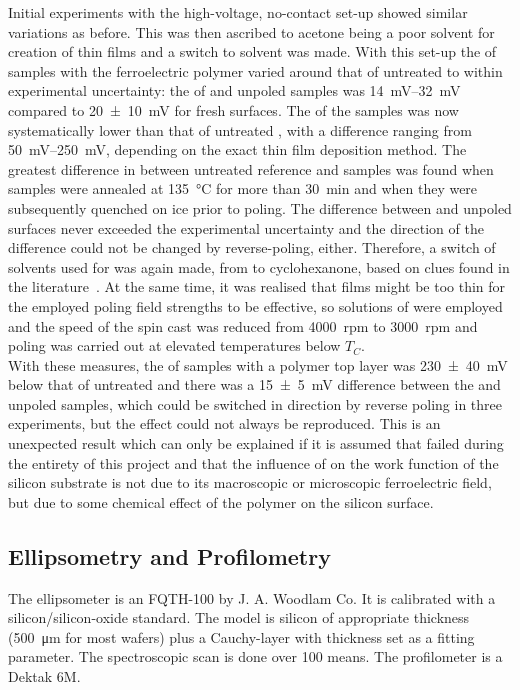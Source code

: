 Initial experiments with the high-voltage, no-contact set-up showed similar variations as before. This was then ascribed to acetone being a poor solvent for creation of \pvdf{} thin films and a switch to \dmf{} solvent was made. With this set-up the \spv{} of samples with the ferroelectric polymer varied around that of untreated \sih{} to within experimental uncertainty: the \spv{} of  and unpoled \pvdf{} samples was \SIrange{14}{32}{\milli\volt} compared to \SI{20+-10}{\milli\volt} for fresh \sih{} surfaces. The \cpd{} of the \pvdf{} samples was now systematically lower than that of untreated \sih{}, with a difference ranging from \SIrange{50}{250}{\milli\volt}, depending on the exact thin film deposition method. The greatest difference in \cpd{} between untreated reference and \pvdf{} samples was found when samples were annealed at \SI{135}{\degreeCelsius} for more than \SI{30}{\minute} and when they were subsequently quenched on ice prior to poling. The difference between  and unpoled \pvdf{} surfaces never exceeded the experimental uncertainty and the direction of the difference could not be changed by reverse-poling, either. Therefore, a switch of solvents used for \pvdf{} was again made, from \dmf{} to cyclohexanone, based on clues found in the literature~\cite{naber_cyclo}. At the same time, it was realised that \pvdf{} films might be too thin for the employed poling field strengths to be effective, so  solutions of \pvdf{} were employed and the speed of the spin cast was reduced from \SI{4000}{rpm} to \SI{3000}{rpm} and poling was carried out at elevated temperatures below $T_C$.\\
With these measures, the \cpd{} of samples with a polymer top layer was \SI{230+-40}{\milli\volt} below that of untreated \sih{} and there was a \SI{15+-5}{\milli\volt} difference between the  and unpoled \pvdf{} samples, which could be switched in direction by reverse poling in three experiments, but the effect could not always be reproduced. This is an unexpected result which can only be explained if it is assumed that  failed during the entirety of this project and that the influence of \pvdf{} on the work function of the silicon substrate is not due to its macroscopic or microscopic ferroelectric field, but due to some chemical effect of the polymer on the silicon surface.
\subsection{Ellipsometry and Profilometry}
The ellipsometer is an FQTH-100 by J. A. Woodlam Co. It is calibrated with a silicon/silicon-oxide standard. The model is silicon of appropriate thickness (\SI{500}{\micro\metre} for most wafers) plus a Cauchy-layer with thickness set as a fitting parameter. The spectroscopic scan is done over \num{100} means. The profilometer is a Dektak 6M.
